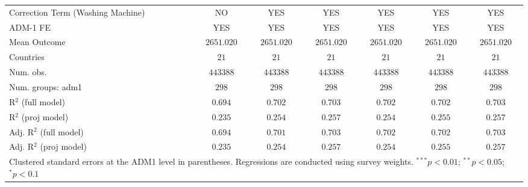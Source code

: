 \begin{table}[htbp]
\begin{center}
\begin{tabular}{l c c c c c c}
Correction Term (Washing Machine) & NO            & YES           & YES           & YES           & YES           & YES           \\
ADM-1 FE                          & YES           & YES           & YES           & YES           & YES           & YES           \\
Mean Outcome                      & $2651.020$    & $2651.020$    & $2651.020$    & $2651.020$    & $2651.020$    & $2651.020$    \\
Countries                         & $21$          & $21$          & $21$          & $21$          & $21$          & $21$          \\
Num. obs.                         & $443388$      & $443388$      & $443388$      & $443388$      & $443388$      & $443388$      \\
Num. groups: adm1                 & $298$         & $298$         & $298$         & $298$         & $298$         & $298$         \\
R$^2$ (full model)                & $0.694$       & $0.702$       & $0.703$       & $0.702$       & $0.702$       & $0.703$       \\
R$^2$ (proj model)                & $0.235$       & $0.254$       & $0.257$       & $0.254$       & $0.255$       & $0.257$       \\
Adj. R$^2$ (full model)           & $0.694$       & $0.701$       & $0.703$       & $0.702$       & $0.702$       & $0.703$       \\
Adj. R$^2$ (proj model)           & $0.235$       & $0.254$       & $0.257$       & $0.254$       & $0.255$       & $0.257$       \\
\hline
\multicolumn{7}{l}{\scriptsize{Clustered standard errors at the ADM1 level in parentheses. Regressions are conducted using survey weights. $^{***}p<0.01$; $^{**}p<0.05$; $^{*}p<0.1$}}
\end{tabular}
\label{main: tableA9}
\end{center}
\end{table}
